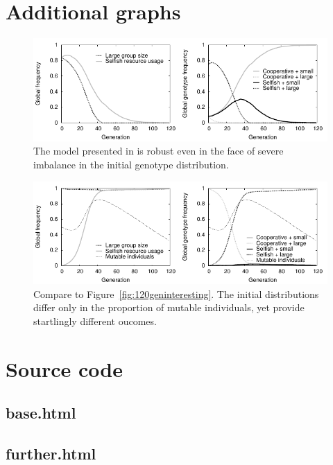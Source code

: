 \documentclass[11pt]{article}
\begin{document}
\begin{appendices}
\section{Additional graphs}
\label{app:graphs}
\vspace{-.5cm}
\begin{figure}[!ht]
  \centering
  \includegraphics{unevenplot.pdf}
  \caption{The model presented in \citet{orig} is robust even in the face of severe imbalance in the initial genotype distribution.}
  \label{fig:unevenplot}
\end{figure}
\vspace{-.5cm}
\begin{figure}[!ht]
  \centering
  \includegraphics{further1.pdf}
  \caption{Compare to Figure~\ref{fig:120geninteresting}. The initial distributions differ only in the proportion of mutable individuals, yet provide startlingly different oucomes.}
  \label{fig:further1}
\end{figure}


\newpage
\section{Source code}
\subsection*{base.html}
\subsection*{further.html}

\end{appendices}
\end{document}
